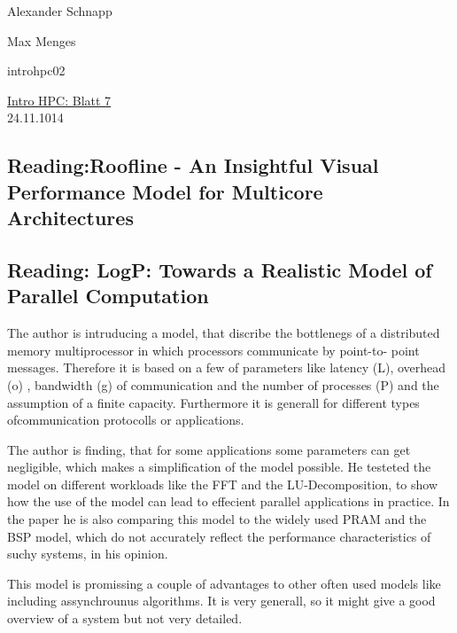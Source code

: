 \documentclass[a4paper,11pt]{scrartcl}
\begin{document}
\hfill Alexander Schnapp

\hfill Max Menges

\hfill introhpc02

\begin{center}
\underline{\Huge{Intro HPC: Blatt 7}}\\
\large{24.11.1014}\\
\end{center}

\subsection{Reading:Roofline - An Insightful
Visual
Performance
Model for
Multicore
Architectures}



\subsection{Reading: LogP: Towards a Realistic Model of Parallel Computation}
The author is intruducing a model, that
discribe the bottlenegs of a distributed memory
multiprocessor in which processors communicate by point-to-
point messages.
Therefore it is based on a few of parameters like latency (L), overhead (o) , bandwidth (g) of communication and the number of processes (P) and the assumption of a finite capacity.
Furthermore it is generall for different types ofcommunication protocolls or applications. 

The author is finding, that for some applications some parameters can get negligible, which makes a simplification of the model possible. He testeted the model on different workloads like the FFT and the LU-Decomposition, to show how the use of the model can lead to effecient parallel applications in practice.
In the paper he is also comparing this model to the widely used PRAM and the BSP model, which do not
accurately reflect the performance characteristics of suchy systems, in his opinion.

This model is promissing a couple of advantages to other often used models like including assynchrounus algorithms. It is 
 very generall, so it might give a good overview of a system but not very detailed.
\end{document}
